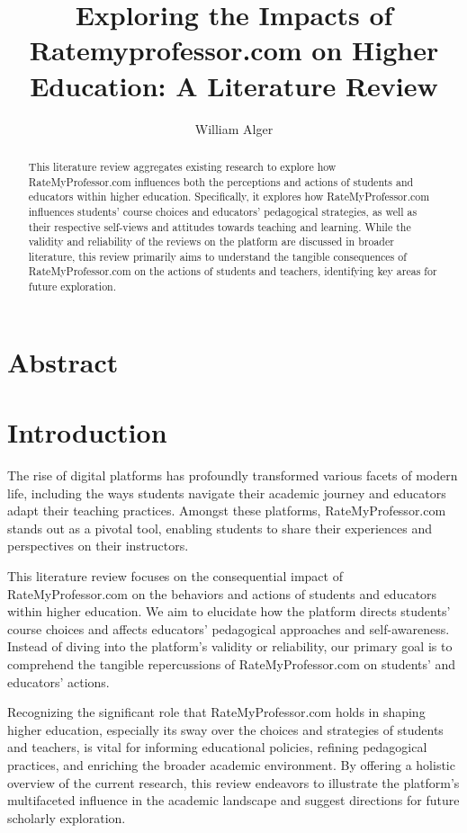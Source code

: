 \documentclass[man, 12pt]{apa7}
\title{Exploring the Impacts of Ratemyprofessor.com on Higher Education: A Literature Review}
\author{William Alger}
\affiliation{Northern Kentucky University}
\begin{document}
\maketitle

\section{Abstract}
\begin{abstract}

This literature review aggregates existing research to explore how RateMyProfessor.com influences both the perceptions and actions of students and educators within higher education. Specifically, it explores how RateMyProfessor.com influences students' course choices and educators' pedagogical strategies, as well as their respective self-views and attitudes towards teaching and learning. While the validity and reliability of the reviews on the platform are discussed in broader literature, this review primarily aims to understand the tangible consequences of RateMyProfessor.com on the actions of students and teachers, identifying key areas for future exploration.


\end{abstract}

\section{Introduction}
The rise of digital platforms has profoundly transformed various facets of modern life, including the ways students navigate their academic journey and educators adapt their teaching practices. Amongst these platforms, RateMyProfessor.com stands out as a pivotal tool, enabling students to share their experiences and perspectives on their instructors.

This literature review focuses on the consequential impact of RateMyProfessor.com on the behaviors and actions of students and educators within higher education. We aim to elucidate how the platform directs students' course choices and affects educators' pedagogical approaches and self-awareness. Instead of diving into the platform's validity or reliability, our primary goal is to comprehend the tangible repercussions of RateMyProfessor.com on students' and educators' actions.

Recognizing the significant role that RateMyProfessor.com holds in shaping higher education, especially its sway over the choices and strategies of students and teachers, is vital for informing educational policies, refining pedagogical practices, and enriching the broader academic environment. By offering a holistic overview of the current research, this review endeavors to illustrate the platform's multifaceted influence in the academic landscape and suggest directions for future scholarly exploration.
\end{document}
